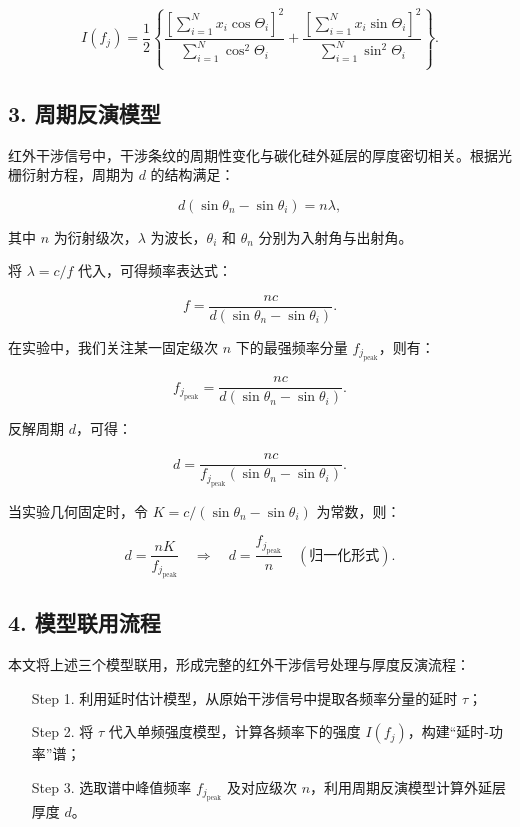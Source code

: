 \documentclass[withoutpreface,bwprint]{cumcmthesis}
\begin{document}
\[
I(f_j) = \frac{1}{2} \left\{ \frac{\left[\sum_{i=1}^{N} x_i \cos\Theta_i\right]^2}{\sum_{i=1}^{N} \cos^2\Theta_i} + \frac{\left[\sum_{i=1}^{N} x_i \sin\Theta_i\right]^2}{\sum_{i=1}^{N} \sin^2\Theta_i} \right\}.
\]

\subsection*{3. 周期反演模型}

红外干涉信号中，干涉条纹的周期性变化与碳化硅外延层的厚度密切相关。根据光栅衍射方程，周期为 $d$ 的结构满足：

\[
d(\sin\theta_n - \sin\theta_i) = n\lambda,
\]

其中 $n$ 为衍射级次，$\lambda$ 为波长，$\theta_i$ 和 $\theta_n$ 分别为入射角与出射角。

将 $\lambda = c / f$ 代入，可得频率表达式：

\[
f = \frac{n c}{d(\sin\theta_n - \sin\theta_i)}.
\]

在实验中，我们关注某一固定级次 $n$ 下的最强频率分量 $f_{j_{\text{peak}}}$，则有：

\[
f_{j_{\text{peak}}} = \frac{n c}{d(\sin\theta_n - \sin\theta_i)}.
\]

反解周期 $d$，可得：

\[
d = \frac{n c}{f_{j_{\text{peak}}}(\sin\theta_n - \sin\theta_i)}.
\]

当实验几何固定时，令 $K = c / (\sin\theta_n - \sin\theta_i)$ 为常数，则：

\[
d = \frac{n K}{f_{j_{\text{peak}}}} \quad \Rightarrow \quad d = \frac{f_{j_{\text{peak}}}}{n} \quad (\text{归一化形式}).
\]

\subsection*{4. 模型联用流程}

本文将上述三个模型联用，形成完整的红外干涉信号处理与厚度反演流程：

\begin{enumerate}
  \item[Step 1.] 利用延时估计模型，从原始干涉信号中提取各频率分量的延时 $\tau$；
  \item[Step 2.] 将 $\tau$ 代入单频强度模型，计算各频率下的强度 $I(f_j)$，构建“延时-功率”谱；
  \item[Step 3.] 选取谱中峰值频率 $f_{j_{\text{peak}}}$ 及对应级次 $n$，利用周期反演模型计算外延层厚度 $d$。
\end{enumerate}
\end{document}
